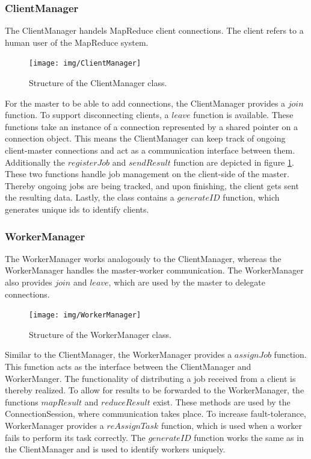 \documentclass[12pt, letterpaper]{article}
\begin{document}
\subsubsection{ClientManager}

The ClientManager handels MapReduce client connections. The client refers to a human user of the MapReduce system. 

\begin{figure}[h]
	\centering
	\texttt{[image: img/ClientManager]}
	\caption{Structure of the ClientManager class.}
	\label{fig:classes_ClientManager}
\end{figure}

For the master to be able to add connections, the ClientManager provides a $join$ function. To support disconnecting clients, a $leave$ function is available. These functions take an instance of a connection represented by a shared pointer on a connection object. This means the ClientManager can keep track of ongoing client-master connections and act as a communication interface between them.\newline 
Additionally the $registerJob$ and $sendResult$ function are depicted in figure \ref{fig:classes_ClientManager}. These two functions handle job management on the client-side of the master. Thereby ongoing jobs are being tracked, and upon finishing, the client gets sent the resulting data. Lastly, the class contains a $generateID$ function, which generates unique ids to identify clients.

\subsubsection{WorkerManager}

The WorkerManager works analogously to the ClientManager, whereas the WorkerManager handles the master-worker communication. The WorkerManager also provides $join$ and $leave$, which are used by the master to delegate connections.  

\begin{figure}[h]
	\centering
	\texttt{[image: img/WorkerManager]}
	\caption{Structure of the WorkerManager class.}
	\label{fig:classes_WorkerManager}
\end{figure}

Similar to the ClientManager, the WorkerManager provides a $assignJob$ function. This function acts as the interface between the ClientManager and WorkerManger. The functionality of distributing a job received from a client is thereby realized. To allow for results to be forwarded to the WorkerManager, the functions $mapResult$ and $reduceResult$ exist. These methods are used by the ConnectionSession, where communication takes place.\newline
To increase fault-tolerance, WorkerManager provides a $reAssignTask$ function, which is used when a worker fails to perform its task correctly. The $generateID$ function works the same as in the ClientManager and is used to identify workers uniquely.  
\end{document}
